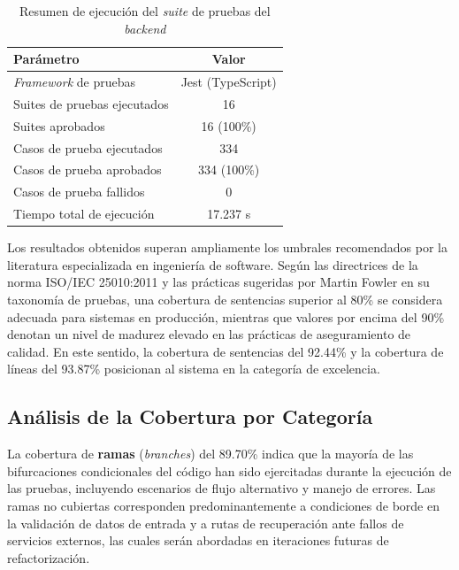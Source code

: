 \begin{table}[htbp]
\centering
\caption{Resumen de ejecuci\'on del \textit{suite} de pruebas del \textit{backend}}
\label{tab:ejecucion-backend}
\begin{tabular}{|l|c|}
\hline
\textbf{Par\'ametro} & \textbf{Valor} \\
\hline
\textit{Framework} de pruebas        & Jest (TypeScript) \\
\hline
Suites de pruebas ejecutados         & 16 \\
\hline
Suites aprobados                     & 16 (100\%) \\
\hline
Casos de prueba ejecutados           & 334 \\
\hline
Casos de prueba aprobados            & 334 (100\%) \\
\hline
Casos de prueba fallidos             & 0 \\
\hline
Tiempo total de ejecuci\'on          & 17.237 s \\
\hline
\end{tabular}
\end{table}

Los resultados obtenidos superan ampliamente los umbrales recomendados por la
literatura especializada en ingenier\'ia de software. Seg\'un las directrices de
la norma ISO/IEC 25010:2011 y las pr\'acticas sugeridas por Martin Fowler en su
taxonom\'ia de pruebas, una cobertura de sentencias superior al 80\% se considera
adecuada para sistemas en producci\'on, mientras que valores por encima del 90\%
denotan un nivel de madurez elevado en las pr\'acticas de aseguramiento de calidad.
En este sentido, la cobertura de sentencias del 92.44\% y la cobertura de
l\'ineas del 93.87\% posicionan al sistema en la categor\'ia de excelencia.

\subsection{An\'alisis de la Cobertura por Categor\'ia}
\label{subsec:analisis-cobertura-backend}

La cobertura de \textbf{ramas} (\textit{branches}) del 89.70\% indica que la
mayor\'ia de las bifurcaciones condicionales del c\'odigo han sido ejercitadas
durante la ejecuci\'on de las pruebas, incluyendo escenarios de flujo alternativo
y manejo de errores. Las ramas no cubiertas corresponden predominantemente a
condiciones de borde en la validaci\'on de datos de entrada y a rutas de
recuperaci\'on ante fallos de servicios externos, las cuales ser\'an abordadas
en iteraciones futuras de refactorizaci\'on.

